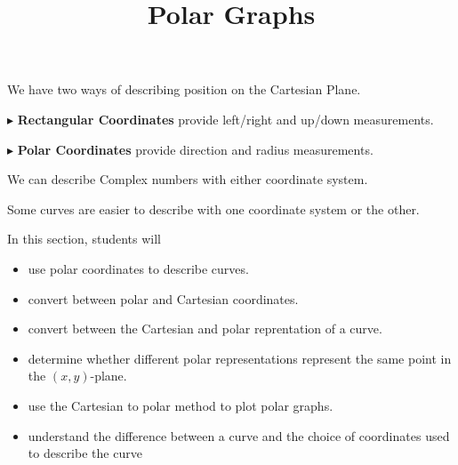 \documentclass{ximera}
\title{Polar Graphs}
\begin{document}
\begin{abstract}
\end{abstract}
\maketitle





We have two ways of describing position on the Cartesian Plane.


$\blacktriangleright$ \textbf{Rectangular Coordinates} provide left/right and up/down measurements.





$\blacktriangleright$ \textbf{Polar Coordinates} provide direction and radius measurements.




We can describe Complex numbers with either coordinate system.


Some curves are easier to describe with one coordinate system or the other.




\begin{sectionOutcomes}
In this section, students will 

\begin{itemize}
\item use polar coordinates to describe curves.
\item convert between polar and Cartesian coordinates.
\item convert between the Cartesian and polar reprentation of a curve.
\item determine whether different polar representations represent the same point in the $(x,y)$-plane.
\item use the Cartesian to polar method to plot polar graphs.
\item understand the difference between a curve and the choice of coordinates used to describe the curve
\end{itemize}
\end{sectionOutcomes}
\end{document}
